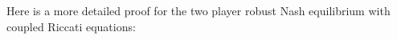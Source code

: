 \documentclass[3p]{elsarticle}
\newenvironment{proof}{\paragraph{Proof:}}{\hfill$\square$}
\begin{document}












Here is a more detailed proof for the two player robust Nash equilibrium with coupled Riccati equations:
\end{document}
